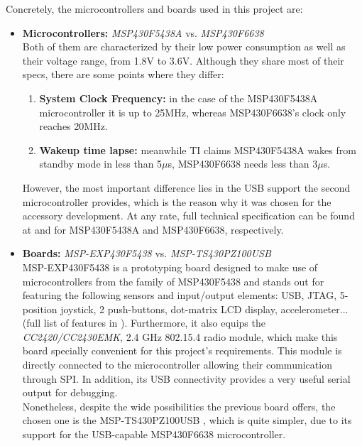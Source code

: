 			Concretely, the microcontrollers and boards used in this project are:
			\begin{itemize}
				\item \textbf{Microcontrollers:} \emph{MSP430F5438A} vs. \emph{MSP430F6638}\\
					Both of them are characterized by their low power consumption as well as their voltage 
					range, from 1.8V to 3.6V. Although they share most of their specs, there are some points
					where they differ:\\
					\begin{enumerate}
						\item \textbf{System Clock Frequency:} in the case of the MSP430F5438A microcontroller
							it is up to 25MHz, whereas MSP430F6638's clock only reaches 20MHz.
						\item \textbf{Wakeup time lapse:} meanwhile TI claims MSP430F5438A wakes from 
							standby mode in less than 5$\mu$s, MSP430F6638 needs less than 3$\mu$s.
					\end{enumerate}
					However, the most important difference lies in the USB support the second microcontroller
					provides, which is the reason why it was chosen for the accessory development. At any rate, 
					full technical specification can be found at \cite{5438a} and \cite{msp430f6638ds} for 
					MSP430F5438A and MSP430F6638, respectively.
				\item \textbf{Boards:} \emph{MSP-EXP430F5438} vs. \emph{MSP-TS430PZ100USB}\\
					MSP-EXP430F5438 \cite{5438aboard} is a prototyping board designed to make use of 
					microcontrollers from the family of MSP430F5438 and stands out for featuring the following 
					sensors and input/output elements: USB, JTAG, 5-position joystick, 2 push-buttons, 
					dot-matrix LCD display, accelerometer... (full list of features in \cite{5438aboard}). 
					Furthermore, it also equips the \emph{CC2420/CC2430EMK}, 2.4 GHz 802.15.4 radio module, 
					which make	
					this board specially convenient for this project's requirements. This module is directly 
					connected to the microcontroller allowing their communication through SPI. In addition, its
					USB connectivity provides a very useful serial output for debugging.\\
					
					Nonetheless, despite the wide possibilities the previous board offers, the chosen one is
					the MSP-TS430PZ100USB \cite{6638board}, which is quite simpler, due to its support for the
					USB-capable MSP430F6638 microcontroller.
			\end{itemize}
			
